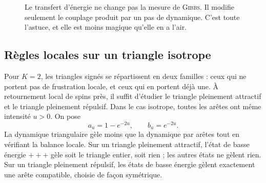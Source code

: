 \begin{figure}[H]
\centering
{}
\caption{Le transfert d'énergie ne change pas la mesure de \textsc{Gibbs}. Il modifie seulement le couplage produit par un pas de dynamique. C'est toute l'astuce, et elle est moins magique qu'elle en a l'air.}
\label{fig:chapII_transfer_energy}
\end{figure}

\subsection{Règles locales sur un triangle isotrope}

Pour $K=2$, les triangles signés se répartissent en deux familles : ceux qui ne portent pas de frustration locale, et ceux qui en portent déjà une. À retournement local de spins près, il suffit d'étudier le triangle pleinement attractif et le triangle pleinement répulsif. Dans le cas isotrope, toutes les arêtes ont même intensité $u>0$. On pose
\begin{equation}
    a_u=1-e^{-2u},
    \qquad
    b_u=e^{-2u}.
    \label{eq:chapII_triangle_ab}
\end{equation}
La dynamique triangulaire gèle moins que la dynamique par arêtes tout en vérifiant la balance locale. Sur un triangle pleinement attractif, l'état de basse énergie $+++$ gèle soit le triangle entier, soit rien ; les autres états ne gèlent rien. Sur un triangle pleinement répulsif, les états de basse énergie gèlent exactement une arête compatible, choisie de façon symétrique.

